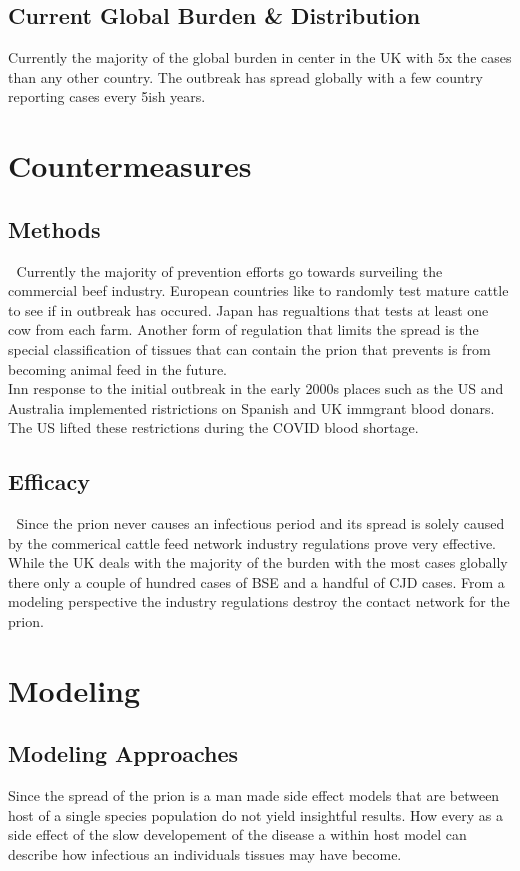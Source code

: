\documentclass{report}
\begin{document}
\section{Current Global Burden & Distribution}
Currently the majority of the global burden in center in the UK with 5x the cases than any other country. The outbreak has spread globally with a few country reporting cases every 5ish years.
\chapter{Countermeasures}
\section{Methods}
Currently the majority of prevention efforts go towards surveiling the commercial beef industry. European countries like  to randomly test mature cattle to see if in outbreak has occured. Japan has regualtions that tests at least one cow from each farm. Another form of regulation that limits the spread is the special classification of tissues that can contain the prion that prevents is from becoming animal feed in the future. \\
Inn response to the initial outbreak in the early 2000s places such as the US and Australia implemented ristrictions on Spanish and UK immgrant blood donars. The US lifted these restrictions during the COVID blood shortage.
\section{Efficacy}
Since the prion never causes an infectious period and its spread is solely caused by the commerical cattle feed network industry regulations prove very effective. While the UK deals with  the majority of the burden with the most cases globally there only a couple of hundred cases of BSE and a handful of CJD cases. From a modeling perspective the industry regulations destroy the contact network for the prion.
\chapter{Modeling}
\section{Modeling Approaches}
Since the spread of the prion is a man made side effect models that are between host of a single species population do  not yield insightful results. How every as a side effect of the slow developement of the disease a within host model can describe how infectious an individuals tissues may have become.
\end{document}

